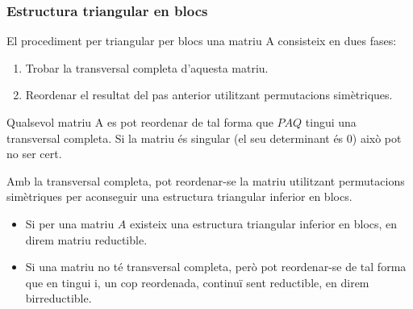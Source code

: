 \documentclass[8pt]{beamer}
\begin{document}
\begin{frame}
  \frametitle{Estructura triangular en blocs}

El procediment per triangular per blocs una matriu A consisteix en dues fases:
\begin{enumerate}
\item Trobar la transversal completa d'aquesta matriu.
\item Reordenar el resultat del pas anterior utilitzant permutacions simètriques.
\end{enumerate}

Qualsevol matriu A es pot reordenar de tal forma que $PAQ$ tingui una transversal completa. Si la matriu és singular (el seu determinant és 0) això pot no ser cert.

Amb la transversal completa, pot reordenar-se la matriu utilitzant permutacions simètriques per aconseguir una estructura triangular inferior en blocs.

\begin{itemize}
\item Si per una matriu $A$ existeix una estructura triangular inferior en blocs, en direm matriu reductible.\\
\item Si una matriu no té transversal completa, però pot reordenar-se de tal forma que en tingui i, un cop reordenada, continuï sent reductible, en direm birreductible.
\end{itemize}

\end{frame}
\end{document}
